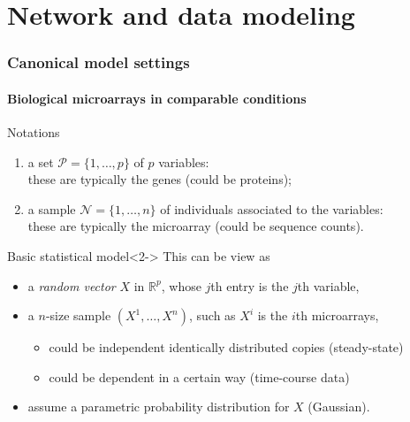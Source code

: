 \section{Network and data modeling}

\begin{frame}
  \frametitle{Canonical model settings}
  \framesubtitle{Biological microarrays in comparable conditions}

  \begin{overlayarea}{\textwidth}{\textheight}

  \begin{block}{Notations}
    \begin{enumerate}
    \item a set $\mathcal{P} = \{1,\dots,p\}$ of $p$ variables:\\
      these are typically \alert{the genes} (could be proteins);
    \item a sample $\mathcal{N}=\{1,\dots,n\}$ of individuals associated to
      the variables:\\
      these are typically \alert{the microarray} (could be sequence counts).
    \end{enumerate}
  \end{block}

  \vfill

  \begin{block}{Basic statistical model}<2->
    This can be view as
    \begin{itemize}
    \item a \alert{\emph{random  vector} $X$ in $\mathbb{R}^p$}, whose
      $j$th entry is the $j$th variable,
    \item a  \alert{$n$-size sample} $(X^1,  \dots, X^n)$, such
      as $X^i$ is the $i$th microarrays,
      \begin{itemize}
      \item could be independent identically distributed copies (steady-state)
      \item could be dependent in a certain way (time-course data)
      \end{itemize}
    \item  assume  a   parametric  probability  distribution  for  $X$
      (Gaussian).
    \end{itemize}
  \end{block}


\end{overlayarea}
\end{frame}
